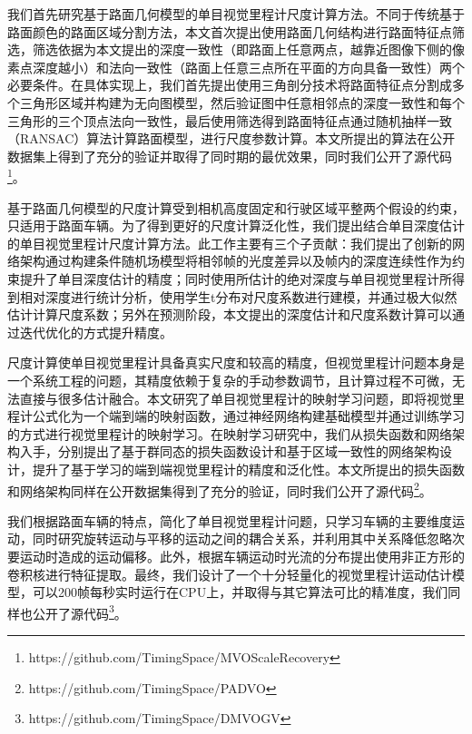     \item 我们首先研究基于路面几何模型的单目视觉里程计尺度计算方法。不同于传统基于路面颜色的路面区域分割方法，本文首次提出使用路面几何结构进行路面特征点筛选，筛选依据为本文提出的深度一致性（即路面上任意两点，越靠近图像下侧的像素点深度越小）和法向一致性（路面上任意三点所在平面的方向具备一致性）两个必要条件。在具体实现上，我们首先提出使用三角剖分技术将路面特征点分割成多个三角形区域并构建为无向图模型，然后验证图中任意相邻点的深度一致性和每个三角形的三个顶点法向一致性，最后使用筛选得到路面特征点通过随机抽样一致（RANSAC）算法计算路面模型，进行尺度参数计算。本文所提出的算法在公开数据集上得到了充分的验证并取得了同时期的最优效果，同时我们公开了源代码\footnote{https://github.com/TimingSpace/MVOScaleRecovery}。
    \item 基于路面几何模型的尺度计算受到相机高度固定和行驶区域平整两个假设的约束，只适用于路面车辆。为了得到更好的尺度计算泛化性，我们提出结合单目深度估计的单目视觉里程计尺度计算方法。此工作主要有三个子贡献：我们提出了创新的网络架构通过构建条件随机场模型将相邻帧的光度差异以及帧内的深度连续性作为约束提升了单目深度估计的精度；同时使用所估计的绝对深度与单目视觉里程计所得到相对深度进行统计分析，使用学生t分布对尺度系数进行建模，并通过极大似然估计计算尺度系数；另外在预测阶段，本文提出的深度估计和尺度系数计算可以通过迭代优化的方式提升精度。
    \item 尺度计算使单目视觉里程计具备真实尺度和较高的精度，但视觉里程计问题本身是一个系统工程的问题，其精度依赖于复杂的手动参数调节，且计算过程不可微，无法直接与很多估计融合。本文研究了单目视觉里程计的映射学习问题，即将视觉里程计公式化为一个端到端的映射函数，通过神经网络构建基础模型并通过训练学习的方式进行视觉里程计的映射学习。在映射学习研究中，我们从损失函数和网络架构入手，分别提出了基于群同态的损失函数设计和基于区域一致性的网络架构设计，提升了基于学习的端到端视觉里程计的精度和泛化性。本文所提出的损失函数和网络架构同样在公开数据集得到了充分的验证，同时我们公开了源代码\footnote{https://github.com/TimingSpace/PADVO}。
    \item 我们根据路面车辆的特点，简化了单目视觉里程计问题，只学习车辆的主要维度运动，同时研究旋转运动与平移的运动之间的耦合关系，并利用其中关系降低忽略次要运动时造成的运动偏移。此外，根据车辆运动时光流的分布提出使用非正方形的卷积核进行特征提取。最终，我们设计了一个十分轻量化的视觉里程计运动估计模型，可以200帧每秒实时运行在CPU上，并取得与其它算法可比的精准度，我们同样也公开了源代码\footnote{https://github.com/TimingSpace/DMVOGV}。
